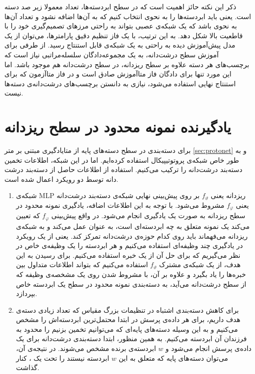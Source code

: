  ذکر این نکته حائز اهمیت است که در سطح ابردسته‌ها، تعداد معمولا زیر صد دسته است. یعنی باید ابردسته‌ها را به نحوی انتخاب کنیم که به آن‌ها اضافه نشود و تعداد آن‌ها به نحوی باشد که یک شبکه‌ی عصبی بتواند به راحتی مرز‌های تصمیم‌گیری خود را با قاطعیت بالا شکل دهد. به این ترتیب، با یک فاز تنظیم دقیق پارامترها، می‌توان از یک مدل پیش‌آموزش دیده به راحتی به یک شبکه‌ی قابل استنتاج رسید. از طرفی برای آموزش سطح درشت‌دانه، به یک مجموعه‌دادگان سلسله‌مراتبی نیاز است که برچسب‌های هر دسته علاوه بر سطح ریزدانه، در سطح درشت‌دانه هم موجود باشد. اما این مورد تنها برای دادگان فاز متاآموزش صادق است و در فاز متاآزمون که برای استنتاج نهایی استفاده می‌شود، نیازی به دانستن برچسب‌های درشت‌دانه‌ی دسته‌ها نیست.
 
 \section{یادگیرنده نمونه محدود در سطح ریزدانه} \label{sec:thetalearner}
 
 برای دسته‌بندی در سطح دسته‌های پایه از متایادگیری مبتنی بر متر
 \ref{sec:protonet}
  و به طور خاص شبکه‌ی پروتوتیپیکال
 \cite{protonet}
 استفاده کرده‌ایم. اما در این شبکه، اطلاعات تخمین دسته‌بند درشت‌دانه را ترکیب می‌کنیم. استفاده از اطلاعات حاصل از دسته‌بند درشت دانه توسط دو رویکرد اعمال شده است.
 \begin{enumerate}
 	\item 
 	شبکه‌ی MLP ریز‌دانه یعنی 
 	$f_{\vartheta}$
 	بر روی پیش‌بینی نهایی شبکه‌ی دسته‌بند درشت‌دانه یعنی 
 	$f_{\varphi}$
 	مشروط می‌شود. با توجه به این اطلاعات اضافه، یادگیری نمونه محدود در سطح ریزدانه به صورت یک یادگیری 
 	انجام می‌شود. در واقع پیش‌بینی 
 	 	$f_{\varphi}$
 	 	که تعیین می‌کند یک نمونه متعلق به چه ابردسته‌ای است، به عنوان 
 	 	عمل می‌کند و به شبکه‌ی ریزدانه می‌فهماند باید روی کدام حوزه‌ی درشت‌دانه تمرکز کند. یعنی از یک رویکرد 
 	 	در یادگیری چند وظیفه‌ای استفاده می‌کنیم و هر ابردسته را یک وظیفه‌ی خاص در نظر می‌گیریم که برای حل آن از یک خبره استفاده می‌کنیم. برای رسیدن به این هدف، از یک شبکه‌ی مشترک 
 	 	$f_{\vartheta}$
 	 	استفاده می‌کنیم که بتواند اطلاعات متداول بین خبره‌ها را یاد بگیرد و علاوه بر آن، با مشروط شدن روی یک مشخصه‌ی وظیفه که از سطح درشت‌دانه می‌آید، به دسته‌بندی نمونه محدود در سطح یک ابردسته خاص بپردازد. 
 	 	\item
 	 	برای کاهش 
 	 	دسته‌بندی اشتباه در تنظیمات بزرگ مقیاس که تعداد زیادی دسته‌ی هدف داریم، برای هر داده‌ی پرسش در ابتدا محتمل‌ترین ابردسته‌اش را مشخص می‌کنیم و به این وسیله دسته‌های پایه‌ای که می‌توانیم تخمین بزنیم را محدود به فرزندان آن ابردسته می‌کنیم. به همین منظور، ابتدا دسته‌بندی درشت‌دانه برای یک داده‌ی پرسش انجام می‌شود و 
 	 	$w$
 	 	ابردسته‌ی برنده مشخص می‌شوند. در نتیجه‌ی آن، می‌توان دسته‌های پایه که متعلق به این 
 	 	$w$
 	 	ابردسته نیستند را تحت یک 
 	 	، کنار گذاشت.
 \end{enumerate}

